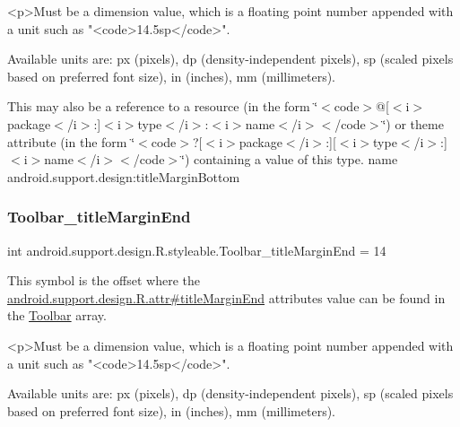 \begin{DoxyVerb}      <p>Must be a dimension value, which is a floating point number appended with a unit such as "<code>14.5sp</code>".
\end{DoxyVerb}
 Available units are\+: px (pixels), dp (density-\/independent pixels), sp (scaled pixels based on preferred font size), in (inches), mm (millimeters). 

This may also be a reference to a resource (in the form \char`\"{}$<$code$>$@\mbox{[}$<$i$>$package$<$/i$>$\+:\mbox{]}$<$i$>$type$<$/i$>$\+:$<$i$>$name$<$/i$>$$<$/code$>$\char`\"{}) or theme attribute (in the form \char`\"{}$<$code$>$?\mbox{[}$<$i$>$package$<$/i$>$\+:\mbox{]}\mbox{[}$<$i$>$type$<$/i$>$\+:\mbox{]}$<$i$>$name$<$/i$>$$<$/code$>$\char`\"{}) containing a value of this type.  name android.\+support.\+design\+:title\+Margin\+Bottom \mbox{\label{classandroid_1_1support_1_1design_1_1R_1_1styleable_a31063956df1fcf227bb270b3d99d655a}} 
\subsubsection{\texorpdfstring{Toolbar\+\_\+title\+Margin\+End}{Toolbar\_titleMarginEnd}}
{\footnotesize\ttfamily int android.\+support.\+design.\+R.\+styleable.\+Toolbar\+\_\+title\+Margin\+End = 14\hspace{0.3cm}{\ttfamily [static]}}

This symbol is the offset where the \hyperlink{classandroid_1_1support_1_1design_1_1R_1_1attr_a6f4a4d32dd0149d89489859570ae1e40}{android.\+support.\+design.\+R.\+attr\#title\+Margin\+End} attribute\textquotesingle{}s value can be found in the \hyperlink{classandroid_1_1support_1_1design_1_1R_1_1styleable_a7783ebe780dbe2a845802a40519a46e9}{Toolbar} array.

\begin{DoxyVerb}      <p>Must be a dimension value, which is a floating point number appended with a unit such as "<code>14.5sp</code>".
\end{DoxyVerb}
 Available units are\+: px (pixels), dp (density-\/independent pixels), sp (scaled pixels based on preferred font size), in (inches), mm (millimeters). 

